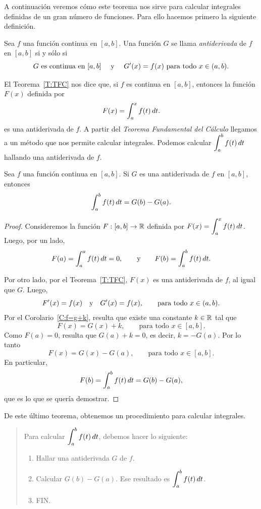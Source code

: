 A continuación veremos cómo este teorema nos sirve para calcular integrales definidas de un gran número de funciones. Para ello hacemos primero la siguiente definición.

\begin{definition}[Antiderivada]
  Sea $f$ una función continua en $[a,b]$. Una función $G$ se llama \emph{antiderivada} de $f$ en $[a,b]$ si y sólo si
  \[
  G\text{ es continua en $[a,b]$ \quad y \quad}
  G'(x)=f(x) \text{ para todo $x\in(a,b)$.}\]
\end{definition}

El Teorema~\ref{T:TFC} nos dice que, si $f$ es continua en $[a,b]$, entonces la función $F(x)$ definida por 
\[
  F(x)=\int_a^x f(t)\,dt.
\]
es una antiderivada de $f$.
A partir del \emph{Teorema Fundamental del Cálculo} llegamos a un método que nos permite calcular integrales. Podemos calcular $\displaystyle\int_a^b f(t)\,dt$ hallando una antiderivada de $f$.

\begin{theorem}
  Sea $f$ una función continua en $[a,b]$. Si $G$ es una antiderivada de $f$ en $[a,b]$, entonces
  $$ \int_a^b f(t)\,dt = G(b)-G(a). $$
\end{theorem}

\begin{proof}
  Consideremos la función $F:[a,b]\to \mathbb{R}$ definida por $\displaystyle  F(x)=\int_a^x f(t)\,dt$. 
  Luego, por un lado, 
  $$F(a)=\int_a^a f(t)\,dt = 0,\qquad\text y\qquad  F(b)=\int_a^b f(t)\,dt.$$

  Por otro lado, por el Teorema~\ref{T:TFC},
  $F(x)$ es una antiderivada de $f$, al igual que $G$. Luego,
  \[
  F'(x)=f(x)\quad\text y\quad G'(x)=f(x),\qquad\text{para todo $x\in(a,b)$.}
  \]
  Por el Corolario~\ref{C:f=g+k}, resulta que existe una constante $k\in\mathbb{R}$ tal que 
  \[
  F(x) = G(x) + k,
  \qquad\text{para todo $x\in[a,b]$.}
  \]
  Como $F(a)=0$, resulta que $G(a)+k=0$, es decir, $k = -G(a)$.
  Por lo tanto
  \[
  F(x) = G(x) - G(a),
  \qquad\text{para todo $x\in[a,b]$.}
  \]
  En particular, 
  \[
  F(b) = \int_a^b f(t)\,dt = G(b)-G(a),
  \]
  que es lo que se quería demostrar.
\end{proof}

De este último teorema, obtenemos un procedimiento para calcular integrales.
\begin{quote}
  Para calcular $\displaystyle\int_a^b f(t)\,dt$, debemos hacer lo siguiente:
  \begin{enumerate}
    \item Hallar una antiderivada $G$ de $f$.
    \item Calcular $G(b)-G(a)$. Ese resultado es $\displaystyle\int_a^b f(t)\,dt$.
    \item FIN.
  \end{enumerate}
\end{quote}


